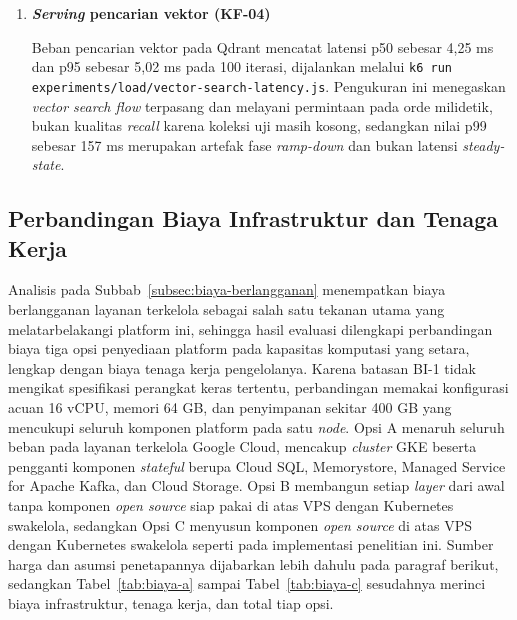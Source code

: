 \begin{enumerate}
    \vspace{0.5em}

    \item \textbf{\textit{Serving} pencarian vektor (KF-04)}

    Beban pencarian vektor pada Qdrant mencatat latensi p50 sebesar 4,25 ms dan p95 sebesar 5,02 ms pada 100 iterasi, dijalankan melalui \texttt{k6 run experiments/load/vector-search-latency.js}. Pengukuran ini menegaskan \textit{vector search flow} terpasang dan melayani permintaan pada orde milidetik, bukan kualitas \textit{recall} karena koleksi uji masih kosong, sedangkan nilai p99 sebesar 157 ms merupakan artefak fase \textit{ramp-down} dan bukan latensi \textit{steady-state}.
\end{enumerate}

\subsection{Perbandingan Biaya Infrastruktur dan Tenaga Kerja}
\label{sec:evaluasi-biaya}

Analisis pada Subbab~\ref{subsec:biaya-berlangganan} menempatkan biaya berlangganan layanan terkelola sebagai salah satu tekanan utama yang melatarbelakangi platform ini, sehingga hasil evaluasi dilengkapi perbandingan biaya tiga opsi penyediaan platform pada kapasitas komputasi yang setara, lengkap dengan biaya tenaga kerja pengelolanya. Karena batasan BI-1 tidak mengikat spesifikasi perangkat keras tertentu, perbandingan memakai konfigurasi acuan 16 vCPU, memori 64 GB, dan penyimpanan sekitar 400 GB yang mencukupi seluruh komponen platform pada satu \textit{node}. Opsi A menaruh seluruh beban pada layanan terkelola Google Cloud, mencakup \textit{cluster} GKE beserta pengganti komponen \textit{stateful} berupa Cloud SQL, Memorystore, Managed Service for Apache Kafka, dan Cloud Storage. Opsi B membangun setiap \textit{layer} dari awal tanpa komponen \textit{open source} siap pakai di atas VPS dengan Kubernetes swakelola, sedangkan Opsi C menyusun komponen \textit{open source} di atas VPS dengan Kubernetes swakelola seperti pada implementasi penelitian ini. Sumber harga dan asumsi penetapannya dijabarkan lebih dahulu pada paragraf berikut, sedangkan Tabel~\ref{tab:biaya-a} sampai Tabel~\ref{tab:biaya-c} sesudahnya merinci biaya infrastruktur, tenaga kerja, dan total tiap opsi.

